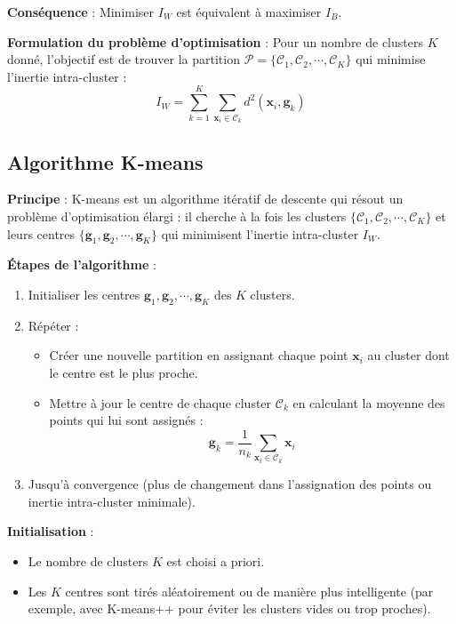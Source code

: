 \documentclass[10pt,a4paper]{article}
\begin{document}
\textbf{Conséquence} : Minimiser $I_W$ est équivalent à maximiser $I_B$.

\textbf{Formulation du problème d'optimisation} :
Pour un nombre de clusters $K$ donné, l'objectif est de trouver la partition $\mathcal{P} = \{\mathcal{C}_1, \mathcal{C}_2, \cdots, \mathcal{C}_K\}$ qui minimise l'inertie intra-cluster :
$$I_W = \sum_{k=1}^{K} \sum_{\mathbf{x}_i \in \mathcal{C}_k} d^2(\mathbf{x}_i, \mathbf{g}_k)$$

\subsection*{Algorithme K-means}

\textbf{Principe} :
K-means est un algorithme itératif de descente qui résout un problème d'optimisation élargi : il cherche à la fois les clusters $\{\mathcal{C}_1, \mathcal{C}_2, \cdots, \mathcal{C}_K\}$ et leurs centres $\{\mathbf{g}_1, \mathbf{g}_2, \cdots, \mathbf{g}_K\}$ qui minimisent l'inertie intra-cluster $I_W$.

\textbf{Étapes de l'algorithme} :
\begin{enumerate}
    \item Initialiser les centres $\mathbf{g}_1, \mathbf{g}_2, \cdots, \mathbf{g}_K$ des $K$ clusters.
    \item Répéter :
    \begin{itemize}
        \item Créer une nouvelle partition en assignant chaque point $\mathbf{x}_i$ au cluster dont le centre est le plus proche.
        \item Mettre à jour le centre de chaque cluster $\mathcal{C}_k$ en calculant la moyenne des points qui lui sont assignés :
        $$\mathbf{g}_k = \frac{1}{n_k} \sum_{\mathbf{x}_i \in \mathcal{C}_k} \mathbf{x}_i$$
    \end{itemize}
    \item Jusqu'à convergence (plus de changement dans l'assignation des points ou inertie intra-cluster minimale).
\end{enumerate}

\textbf{Initialisation} :
\begin{itemize}
    \item Le nombre de clusters $K$ est choisi a priori.
    \item Les $K$ centres sont tirés aléatoirement ou de manière plus intelligente (par exemple, avec K-means++ pour éviter les clusters vides ou trop proches).
\end{itemize}
\end{document}
